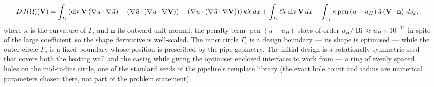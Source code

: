 \documentclass[preview]{standalone}
\let\oldcdot\cdot
\let\cdot\oldcdot
\begin{document}
\begin{dmath*}
DJ(\Omega)(\mathbf V) = \int_{D} \left(\operatorname{div} {\mathbf V} \left(  \nabla u  \cdot  \nabla \tilde u  \right) - \left(  \nabla \tilde u  \cdot \left(  \nabla u  \cdot  \nabla {\mathbf V}  \right) \right) - \left(  \nabla u  \cdot \left(  \nabla \tilde u  \cdot  \nabla {\mathbf V}  \right) \right)\right) k \raisebox{\depth}{$\chi$} \,dx + \int_{D} \ell \raisebox{\depth}{$\chi$} \operatorname{div} {\mathbf V} \,dx + \int_{\Gamma_i} \kappa \operatorname{pen} \left( u - u_{H}\right) \tilde u \left(\mathbf V \cdot \mathbf n\right) \,ds_x ,
\end{dmath*}
where $\kappa$ is the curvature of $\Gamma_i$ and $\mathbf n$ its outward unit normal; the penalty term $\operatorname{pen}\left(u - u_H\right)$ stays of order $u_H / \operatorname{Bi} \approx u_H \times 10^{-11}$ in spite of the large coefficient, so the shape derivative is well-scaled.  The inner circle $\Gamma_i$ is a design boundary — its shape is optimised — while the outer circle $\Gamma_o$ is a fixed boundary whose position is prescribed by the pipe geometry.
The initial design is a rotationally symmetric seed that covers both the heating wall and the casing while giving the optimiser enclosed interfaces to work from — a ring of evenly spaced holes on the mid-radius circle, one of the standard seeds of the pipeline's template library (the exact hole count and radius are numerical parameters chosen there, not part of the problem statement).
\end{document}
